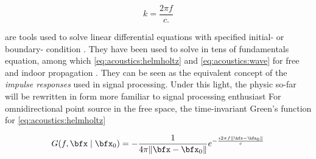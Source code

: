 \begin{equation}
    k = \frac{2 \pi f}{c
    .}
\end{equation}

 are tools used to solve linear differential equations with specified
initial- or boundary- condition \cite{Duffy2015}.
They have been used to solve in tens of fundamentals equation,
among which \cref{eq:acoustics:helmholtz} and \cref{eq:acoustics:wave}
for free and indoor propagation
.
They can be seen as the equivalent concept of the \textit{impulse responses} used in signal processing.
Under this light, the physic so-far will be rewritten in form more familiar to signal processing enthusiast
For omnidirectional point source in the free space, the time-invariant Green's function for \cref{eq:acoustics:helmholtz}

\begin{equation}
    G(f, \bfx \mid {\bfx}_0) = - \frac{1}{4 \pi \norm{\bfx - {\bfx}_0}} e^{- \frac{\Ii  2 \pi f \norm{\bfx - {\bfx}_0}}{\speedOfSound}}
\end{equation}






